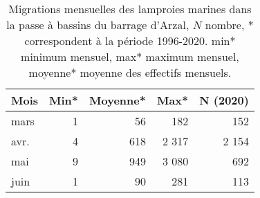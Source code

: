 \begin{table}[htbp]
\centering
\begin{tabular}{lrrrr}
  \hline
Mois & Min* & Moyenne* & Max* & N (2020) \\ 
  \hline
mars & 1 & 56 & 182 & 152 \\ 
  avr. & 4 & 618 & 2 317 & 2 154 \\ 
  mai & 9 & 949 & 3 080 & 692 \\ 
  juin & 1 & 90 & 281 & 113 \\ 
   \hline
\end{tabular}
\caption{Migrations mensuelles des lamproies marines dans la passe à bassins du barrage d'Arzal, $N$ nombre, * correspondent à
				la période 1996-2020. min* minimum mensuel, max* maximum mensuel, moyenne* moyenne des effectifs mensuels.} 
\label{table_lpm_mois}
\end{table}
